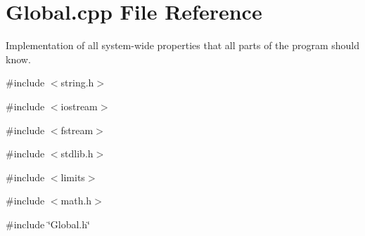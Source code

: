 \section{Global.cpp File Reference}
\label{Global_8cpp}


Implementation of all system-\/wide properties that all parts of the program should know.  


{\ttfamily \#include $<$string.h$>$}\par
{\ttfamily \#include $<$iostream$>$}\par
{\ttfamily \#include $<$fstream$>$}\par
{\ttfamily \#include $<$stdlib.h$>$}\par
{\ttfamily \#include $<$limits$>$}\par
{\ttfamily \#include $<$math.h$>$}\par
{\ttfamily \#include \char`\"{}Global.h\char`\"{}}\par
